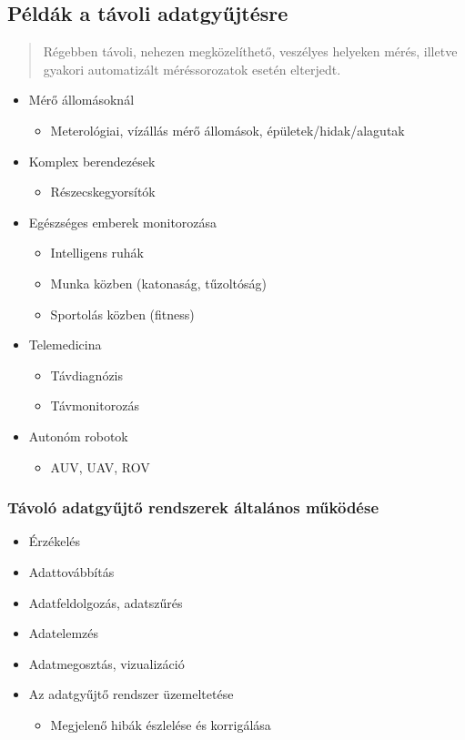 \subsection{Példák a távoli adatgyűjtésre}
\begin{quote}
    Régebben távoli, nehezen megközelíthető, veszélyes helyeken mérés, illetve gyakori automatizált méréssorozatok esetén elterjedt.
\end{quote}
\begin{itemize}
    \item Mérő állomásoknál
    \begin{itemize}
        \item Meterológiai, vízállás mérő állomások, épületek/hidak/alagutak
    \end{itemize}
    \item Komplex berendezések
    \begin{itemize}
        \item Részecskegyorsítók
    \end{itemize}
    \item Egészséges emberek monitorozása
    \begin{itemize}
        \item Intelligens ruhák
        \item Munka közben (katonaság, tűzoltóság)
        \item Sportolás közben (fitness)
    \end{itemize}
    \item Telemedicina
    \begin{itemize}
        \item Távdiagnózis
        \item Távmonitorozás
    \end{itemize}
    \item Autonóm robotok
    \begin{itemize}
        \item AUV, UAV, ROV
    \end{itemize}
\end{itemize}

\subsubsection{Távoló adatgyűjtő rendszerek általános működése}
\begin{itemize}
    \item Érzékelés
    \item Adattovábbítás
    \item Adatfeldolgozás, adatszűrés
    \item Adatelemzés
    \item Adatmegosztás, vizualizáció
    \item Az adatgyűjtő rendszer üzemeltetése
    \begin{itemize}
        \item Megjelenő hibák észlelése és korrigálása
    \end{itemize}
\end{itemize}

